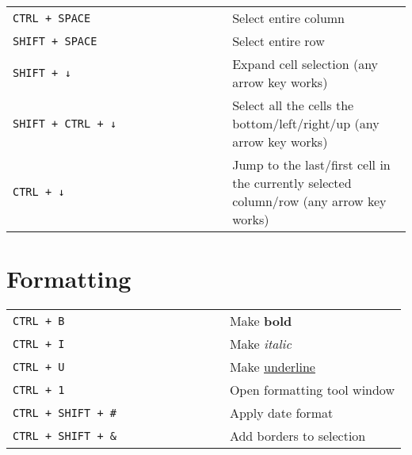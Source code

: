 \documentclass[8pt]{extarticle} %
\begin{document}
\begin{multicols}{2}
\begin{tabular}{L{0.55\linewidth} L{0.45\linewidth}}
    \tt CTRL + SPACE            & Select entire column \\
    \tt SHIFT + SPACE           & Select entire row \\
    \tt SHIFT + ↓               & Expand cell selection (any arrow key works) \\
    \tt SHIFT + CTRL + ↓        & Select all the cells the bottom/left/right/up (any arrow key works) \\
    \tt CTRL + ↓                & Jump to the last/first cell in the currently selected column/row (any arrow key works) \\

  \end{tabular}


\section{Formatting}

  \begin{tabular}{L{0.55\linewidth} L{0.45\linewidth}}
    
    \tt CTRL + B                & Make \textbf{bold} \\
    \tt CTRL + I                & Make \textit{italic} \\
    \tt CTRL + U                & Make \underline{underline} \\
    \tt CTRL + 1                & Open formatting tool window \\
    \tt CTRL + SHIFT + \#        & Apply date format \\
    \tt CTRL + SHIFT + \&       & Add borders to selection \\
    
  \end{tabular}


\end{multicols}
\end{document}
